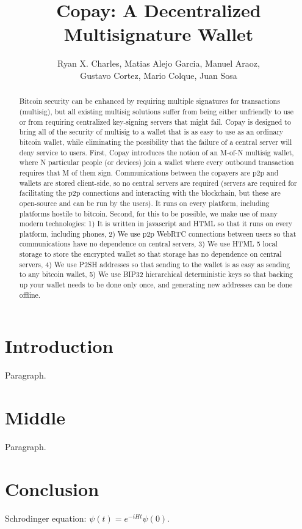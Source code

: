 \documentclass{article}
\begin{document}
\pagestyle{headings}
\title{Copay: A Decentralized Multisignature Wallet}
\author{
Ryan X. Charles,
Matias Alejo Garcia,
Manuel Araoz,\\
Gustavo Cortez,
Mario Colque,
Juan Sosa
}
\date{}
\maketitle
\begin{abstract}
Bitcoin security can be enhanced by requiring multiple signatures for transactions (multisig), but all existing multisig solutions suffer from being either unfriendly to use or from requiring centralized key-signing servers that might fail.
Copay is designed to bring all of the security of multisig to a wallet that is as easy to use as an ordinary bitcoin wallet, while eliminating the possibility that the failure of a central server will deny service to users.
First, Copay introduces the notion of an M-of-N multisig wallet, where N particular people (or devices) join a wallet where every outbound transaction requires that M of them sign.
Communications between the copayers are p2p and wallets are stored client-side, so no central servers are required (servers are required for facilitating the p2p connections and interacting with the blockchain, but these are open-source and can be run by the users).
It runs on every platform, including platforms hostile to bitcoin.
Second, for this to be possible, we make use of many modern technologies:
1) It is written in javascript and HTML so that it runs on every platform, including phones,
2) We use p2p WebRTC connections between users so that communications have no dependence on central servers,
3) We use HTML 5 local storage to store the encrypted wallet so that storage has no dependence on central servers,
4) We use P2SH addresses so that sending to the wallet is as easy as sending to any bitcoin wallet,
5) We use BIP32 hierarchical deterministic keys so that backing up your wallet needs to be done only once, and generating new addresses can be done offline.
\end{abstract}

\section{Introduction}

Paragraph.

\section{Middle}

Paragraph.

\section{Conclusion}

Schrodinger equation: $\psi(t)=e^{-iHt}\psi(0)$.
\end{document}
